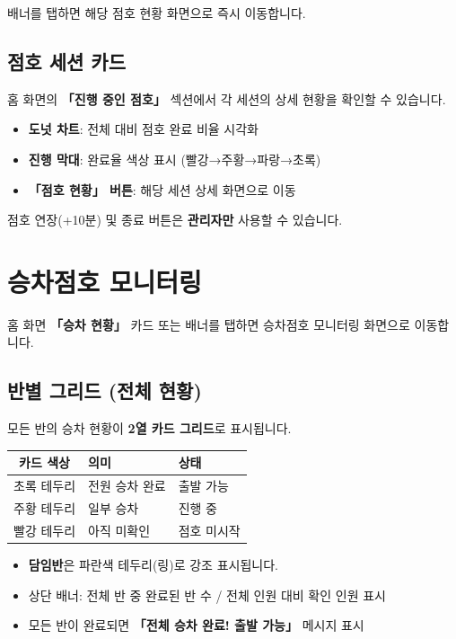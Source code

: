 \documentclass[a4paper,11pt]{article}
\begin{document}
배너를 탭하면 해당 점호 현황 화면으로 즉시 이동합니다.

\subsection{점호 세션 카드}

홈 화면의 \textbf{「진행 중인 점호」} 섹션에서 각 세션의 상세 현황을 확인할 수 있습니다.

\begin{itemize}
  \item \textbf{도넛 차트}: 전체 대비 점호 완료 비율 시각화
  \item \textbf{진행 막대}: 완료율 색상 표시 (빨강→주황→파랑→초록)
  \item \textbf{「점호 현황」 버튼}: 해당 세션 상세 화면으로 이동
\end{itemize}

\begin{tcolorbox}[warnbox]
점호 연장(+10분) 및 종료 버튼은 \textbf{관리자만} 사용할 수 있습니다.
\end{tcolorbox}

\section{승차점호 모니터링}

홈 화면 \textbf{「승차 현황」} 카드 또는 배너를 탭하면 승차점호 모니터링 화면으로 이동합니다.

\subsection{반별 그리드 (전체 현황)}

모든 반의 승차 현황이 \textbf{2열 카드 그리드}로 표시됩니다.

\begin{center}
\begin{tabular}{@{}cll@{}}
  \toprule
  \textbf{카드 색상} & \textbf{의미} & \textbf{상태} \\
  \midrule
  초록 테두리 & 전원 승차 완료 & 출발 가능 \\
  주황 테두리 & 일부 승차 & 진행 중 \\
  빨강 테두리 & 아직 미확인 & 점호 미시작 \\
  \bottomrule
\end{tabular}
\end{center}

\begin{itemize}
  \item \textbf{담임반}은 파란색 테두리(링)로 강조 표시됩니다.
  \item 상단 배너: 전체 반 중 완료된 반 수 / 전체 인원 대비 확인 인원 표시
  \item 모든 반이 완료되면 \textbf{「전체 승차 완료! 출발 가능」} 메시지 표시
\end{itemize}
\end{document}
